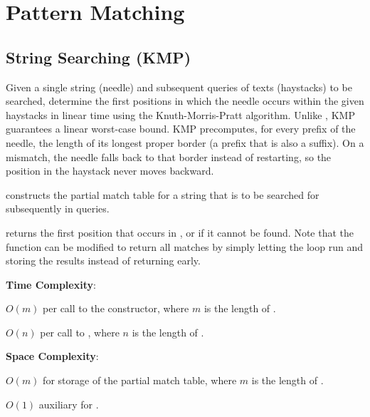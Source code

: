 \section{\texorpdfstring{Pattern Matching}{3.3 Pattern Matching}}
\setcounter{section}{3}
\setcounter{subsection}{0}
\subsection{String Searching (KMP)}
\label{sec:3.3.1}
Given a single string (needle) and subsequent queries of texts (haystacks) to be searched, determine the first positions in which the needle occurs within the given haystacks in linear time using the Knuth-Morris-Pratt algorithm. Unlike , KMP guarantees a linear worst-case bound. KMP precomputes, for every prefix of the needle, the length of its longest proper border (a prefix that is also a suffix). On a mismatch, the needle falls back to that border instead of restarting, so the position in the haystack never moves backward.

\begin{compactitem}
  \item {} constructs the partial match table for a string  that is to be searched for subsequently in  queries.
  \item {} returns the first position that  occurs in , or  if it cannot be found. Note that the function can be modified to return all matches by simply letting the loop run and storing the results instead of returning early.
\end{compactitem}

\textbf{Time Complexity}:
\begin{compactitem}
  \item $O(m)$ per call to the constructor, where $m$ is the length of .
  \item $O(n)$ per call to , where $n$ is the length of .
\end{compactitem}

\textbf{Space Complexity}:
\begin{compactitem}
  \item $O(m)$ for storage of the partial match table, where $m$ is the length of .
  \item $O(1)$ auxiliary for .
\end{compactitem}

